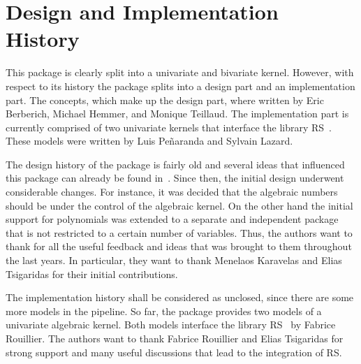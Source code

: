 

\section{Design and Implementation History}

This package is clearly split into a univariate and bivariate
kernel. However, with respect to its history the package splits into
a design part and an implementation part.  The concepts, which make up
the design part, where written by Eric Berberich, Michael Hemmer, and
Monique Teillaud. The implementation part is currently comprised of two
univariate kernels that interface the library RS~\cite{cgal:r-rs}. These
models were written by Luis Pe\~{n}aranda and Sylvain Lazard.

The design history of the package is fairly old and several
ideas that influenced this package can already be found
in~\cite{cgal:bhkt-risak-07}. Since then, the initial design underwent
considerable changes. For instance, it was decided that the algebraic
numbers should be under the control of the algebraic kernel. On the other
hand the initial support for polynomials was extended to a separate
and independent package that is not restricted to a certain number of
variables. Thus, the authors want to thank for all the useful feedback and
ideas that was brought to them throughout the last years. In particular,
they want to thank Menelaos Karavelas and Elias Tsigaridas for their
initial contributions.


The implementation history shall be considered as unclosed, since there
are some more models in the pipeline. So far, the package provides
two models of a univariate algebraic kernel. Both models interface the
library RS~\cite{cgal:r-rs} by Fabrice Rouillier. The authors want to
thank Fabrice Rouillier and Elias Tsigaridas for strong support and many
useful discussions that lead to the integration of RS.

